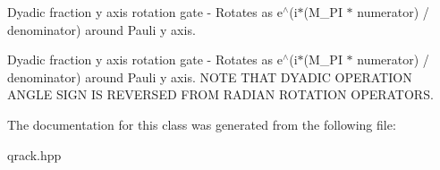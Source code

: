 Dyadic fraction y axis rotation gate -\/ Rotates as e$^\wedge$(i$\ast$(M\+\_\+\+PI $\ast$ numerator) / denominator) around Pauli y axis. 

Dyadic fraction y axis rotation gate -\/ Rotates as e$^\wedge$(i$\ast$(M\+\_\+\+PI $\ast$ numerator) / denominator) around Pauli y axis. N\+O\+TE T\+H\+AT D\+Y\+A\+D\+IC O\+P\+E\+R\+A\+T\+I\+ON A\+N\+G\+LE S\+I\+GN IS R\+E\+V\+E\+R\+S\+ED F\+R\+OM R\+A\+D\+I\+AN R\+O\+T\+A\+T\+I\+ON O\+P\+E\+R\+A\+T\+O\+RS. 

The documentation for this class was generated from the following file\+:\begin{DoxyCompactItemize}
\item 
qrack.\+hpp\end{DoxyCompactItemize}
